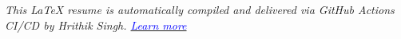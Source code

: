 \documentclass[9pt, letterpaper]{russell}
\begin{document}

\makecvheader










% 

% 


\vfill
\begin{center}
  {\fontsize{6.5pt}{8pt}\selectfont\itshape\color{graytext}
  This LaTeX resume is automatically compiled and delivered via GitHub Actions CI/CD by Hrithik Singh.\enskip
  \href{https://github.com/hrithikksingh3/Resume.Hrithik}{\textcolor{blue}{Learn more}}}
\end{center}
\vspace*{-2mm}
\end{document}

